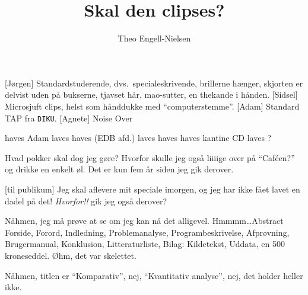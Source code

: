 \documentclass[danish,11pt]{article}
\title{Skal den clipses?}
\author{Theo Engell-Nielsen}
\begin{document}
\maketitle

\begin{sketch}

\begin{roles}
  [Jørgen] Standardstuderende, dvs.\ specialeskrivende, brillerne
  hænger, skjorten er delvist uden på bukserne, tjavset hår,
  mao-sutter, en thekande i hånden.
  [Sidsel] Microsjuft clips, helst som hånddukke med
  ``computerstemme''.
  [Adam] Standard TAP fra {\tt DIKU}.
  [Agnete] Noise Over
\end{roles}

\begin{props}
   haves
   Adam
   laves
   haves (EDB afd.)
   laves
   haves
   haves
   kantine
   CD laves
   ? 
\end{props}


 Hvad pokker skal dog jeg gøre? Hvorfor skulle jeg også
liiiige over på ``Caféen?'' og drikke en enkelt øl. Det er kun fem år siden jeg gik derover.

 [til publikum] Jeg skal aflevere mit speciale imorgen, og jeg
har ikke fået lavet en dadel på det!  {\em Hvorfor!!} gik
jeg også derover?


 Nåhmen, jeg må prøve at se om jeg kan nå det
alligevel. Hmmmm\ldots Abstract 
Forside, Forord, Indledning, Problemanalyse, Programbeskrivelse,
Afprøvning, Brugermanual, Konklusion, Litteraturliste, Bilag:
Kildetekst, Uddata, en 500 kroneseddel. Øhm, det var skelettet.

 Nåhmen, titlen er ``Komparativ'', nej,  ``Kvantitativ analyse'', nej,
det holder heller ikke. 


\end{sketch}
\end{document}
